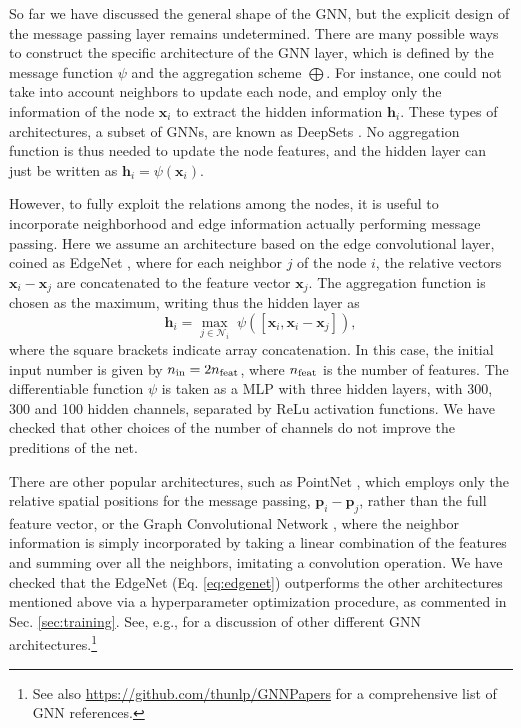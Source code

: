 \documentclass[twocolumn]{aastex631}
\begin{document}
So far we have discussed the general shape of the GNN, but the explicit design of the message passing layer remains undetermined. There are many possible ways to construct the specific architecture of the GNN layer, which is defined by the message function $\psi$ and the aggregation scheme $\bigoplus$. For instance, one could not take into account neighbors to update each node, and employ only the information of the node $\textbf{x}_i$ to extract the hidden information $\textbf{h}_i$. These types of architectures, a subset of GNNs, are known as DeepSets \citep{2017arXiv170306114Z}. No aggregation function is thus needed to update the node features, and the hidden layer can just be written as $\textbf{h}_i = \psi(\textbf{x}_i)$. 

However, to fully exploit the relations among the nodes, it is useful to incorporate neighborhood and edge information actually performing message passing. Here we assume an architecture based on the edge convolutional layer, coined as EdgeNet \citep{wang2019dynamic}, where for each neighbor $j$ of the node $i$, the relative vectors $\textbf{x}_i-\textbf{x}_j$ are concatenated to the feature vector $\textbf{x}_j$. The aggregation function is chosen as the maximum, writing thus the hidden layer as
\begin{equation}
 \textbf{h}_i = \max_{j \in \mathcal{N}_i} \; \psi([\textbf{x}_i,\textbf{x}_i-\textbf{x}_j]) ,
 \label{eq:edgenet}
\end{equation}
where the square brackets indicate array concatenation. In this case, the initial input number is given by $n_{\rm in}=2n_{\rm feat}$, where $n_{\rm feat}$ is the number of features. The differentiable function $\psi$ is taken as a MLP with three hidden layers, with 300, 300 and 100 hidden channels, separated by ReLu activation functions. We have checked that other choices of the number of channels do not improve the preditions of the net.

There are other popular architectures, such as PointNet \citep{qi2017pointnet,qi2017pointnet++}, which employs only the relative spatial positions for the message passing, $\textbf{p}_i-\textbf{p}_j$, rather than the full feature vector, or the Graph Convolutional Network \citep{kipf2017semisupervised}, where the neighbor information is simply incorporated by taking a linear combination of the features and summing over all the neighbors, imitating a convolution operation. We have checked that the EdgeNet (Eq. \ref{eq:edgenet}) outperforms the other architectures mentioned above via a hyperparameter optimization procedure, as commented in Sec. \ref{sec:training}. See, e.g., \cite{2019arXiv190100596W, 2018arXiv181208434Z} for a discussion of other different GNN architectures.\footnote{See also \url{https://github.com/thunlp/GNNPapers} for a comprehensive list of GNN references.}
\end{document}
